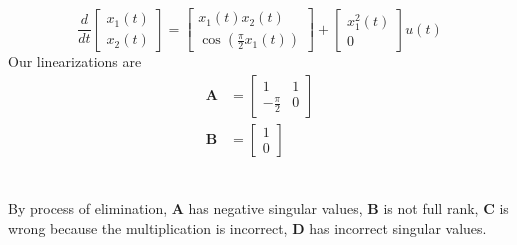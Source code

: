 \documentclass[]{article}
\newcommand{\diff}[1]{\frac{d}{d #1}}
\begin{document}
\section{}

\begin{equation}
	\diff{t} \begin{bmatrix}
	x_1(t) \\
	x_2(t)
	\end{bmatrix} =
	\begin{bmatrix}
	x_1(t) x_2(t) \\
	\cos\left(\frac{\pi}{2} x_1(t)\right)
	\end{bmatrix} +
	\begin{bmatrix}
	x_1^2(t) \\
	0
	\end{bmatrix} u(t)
\end{equation}
Our linearizations are
\begin{align}
	\bm{A} &=
	\begin{bmatrix}
	1 & 1 \\
	-\frac{\pi}{2} & 0
	\end{bmatrix} \\
	\bm{B} &=
	\begin{bmatrix}
	1 \\
	0
	\end{bmatrix}
\end{align}

\section{}

By process of elimination, \textbf{A} has negative singular values, \textbf{B} is not full rank, \textbf{C} is wrong because the multiplication is incorrect, \textbf{D} has incorrect singular values.

\section{}
\end{document}
